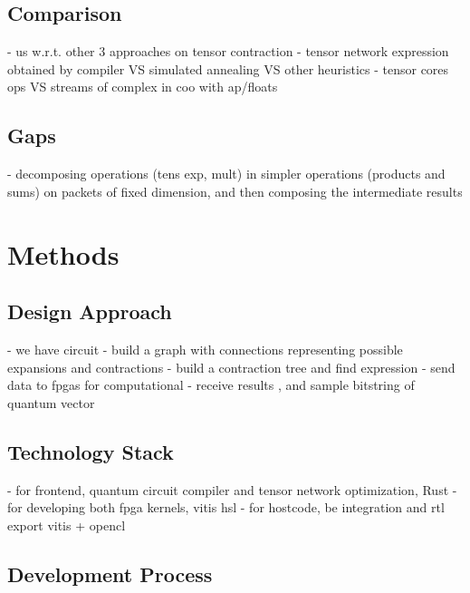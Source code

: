\documentclass[12pt,oneside,a4paper]{article}
\begin{document}
\subsection{Comparison}
- us w.r.t. other 3 approaches on tensor contraction
- tensor network expression obtained by compiler VS simulated annealing VS other heuristics
- tensor cores ops VS streams of complex in coo with ap/floats

\subsection{Gaps}
- decomposing operations (tens exp, mult) in simpler operations (products and sums) on packets of fixed dimension, and then composing the intermediate results





\section{Methods} 

\subsection{Design Approach}
- we have circuit
- build a graph with connections representing possible expansions and contractions
- build a contraction tree and find expression
- send data to fpgas for computational
- receive results , and sample bitstring of quantum vector

\subsection{Technology Stack}
- for frontend, quantum circuit compiler and tensor network optimization, Rust
- for developing both fpga kernels, vitis hsl
- for hostcode, be integration and rtl export vitis + opencl

\subsection{Development Process}
\end{document}
